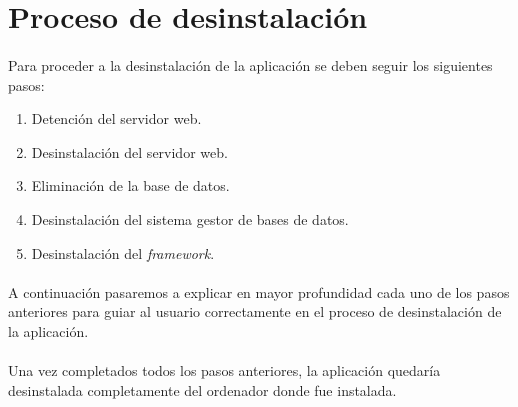 \section{Proceso de desinstalación}

  \paragraph{}Para proceder a la desinstalación de la aplicación se deben seguir
  los siguientes pasos:

  \begin{enumerate}
   \item Detención del servidor web.
   \item Desinstalación del servidor web.
   \item Eliminación de la base de datos.
   \item Desinstalación del sistema gestor de bases de datos.
   \item Desinstalación del \textit{framework}.
  \end{enumerate}

  \paragraph{}A continuación pasaremos a explicar en mayor profundidad cada
  uno de los pasos anteriores para guiar al usuario correctamente en el proceso
  de desinstalación de la aplicación.

  \begin{enumerate}
    
    
    
    
    
  \end{enumerate}

  \paragraph{}Una vez completados todos los pasos anteriores, la aplicación
  quedaría desinstalada completamente del ordenador donde fue instalada.